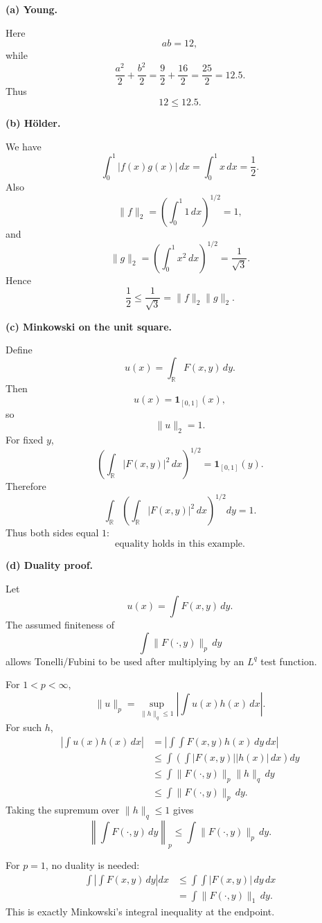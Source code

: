 \begin{solution}
\par\smallskip\noindent\textbf{(a) Young.}

Here
\[
ab=12,
\]
while
\[
\frac{a^2}{2}+\frac{b^2}{2}
=
\frac92+\frac{16}{2}
=
\frac{25}{2}
=
12.5.
\]
Thus
\[
\boxed{12\le12.5.}
\]

\par\smallskip\noindent\textbf{(b) Hölder.}

We have
\[
\int_0^1|f(x)g(x)|\,dx
=
\int_0^1x\,dx
=
\frac12.
\]
Also
\[
\|f\|_2
=
\left(\int_0^1 1\,dx\right)^{1/2}
=
1,
\]
and
\[
\|g\|_2
=
\left(\int_0^1x^2\,dx\right)^{1/2}
=
\frac1{\sqrt3}.
\]
Hence
\[
\boxed{
\frac12
\le
\frac1{\sqrt3}
=
\|f\|_2\|g\|_2.}
\]

\par\smallskip\noindent\textbf{(c) Minkowski on the unit square.}

Define
\[
u(x)
=
\int_{\mathbb R}F(x,y)\,dy.
\]
Then
\[
u(x)=\mathbf1_{[0,1]}(x),
\]
so
\[
\|u\|_2=1.
\]
For fixed \(y\),
\[
\left(
\int_{\mathbb R}|F(x,y)|^2\,dx
\right)^{1/2}
=
\mathbf1_{[0,1]}(y).
\]
Therefore
\[
\int_{\mathbb R}
\left(
\int_{\mathbb R}|F(x,y)|^2\,dx
\right)^{1/2}dy
=
1.
\]
Thus both sides equal \(1\):
\[
\boxed{\text{equality holds in this example}.}
\]

\par\smallskip\noindent\textbf{(d) Duality proof.}

Let
\[
u(x)
=
\int F(x,y)\,dy.
\]
The assumed finiteness of
\[
\int\|F(\cdot,y)\|_p\,dy
\]
allows Tonelli/Fubini to be used after multiplying by an \(L^q\) test
function.

For \(1<p<\infty\),
\[
\|u\|_p
=
\sup_{\|h\|_q\le1}
\left|
\int u(x)h(x)\,dx
\right|.
\]
For such \(h\),
\[
\begin{aligned}
\left|
\int u(x)h(x)\,dx
\right|
&=
\left|
\int\int
F(x,y)h(x)\,dy\,dx
\right|\\
&\le
\int
\left(
\int
|F(x,y)||h(x)|\,dx
\right)dy\\
&\le
\int
\|F(\cdot,y)\|_p
\|h\|_q\,dy\\
&\le
\int
\|F(\cdot,y)\|_p\,dy.
\end{aligned}
\]
Taking the supremum over \(\|h\|_q\le1\) gives
\[
\boxed{
\left\|
\int F(\cdot,y)\,dy
\right\|_p
\le
\int
\|F(\cdot,y)\|_p\,dy.}
\]

For \(p=1\), no duality is needed:
\[
\begin{aligned}
\int
\left|
\int F(x,y)\,dy
\right|dx
&\le
\int\int|F(x,y)|\,dy\,dx\\
&=
\int
\|F(\cdot,y)\|_1\,dy.
\end{aligned}
\]
This is exactly Minkowski's integral inequality at the endpoint.
\end{solution}


